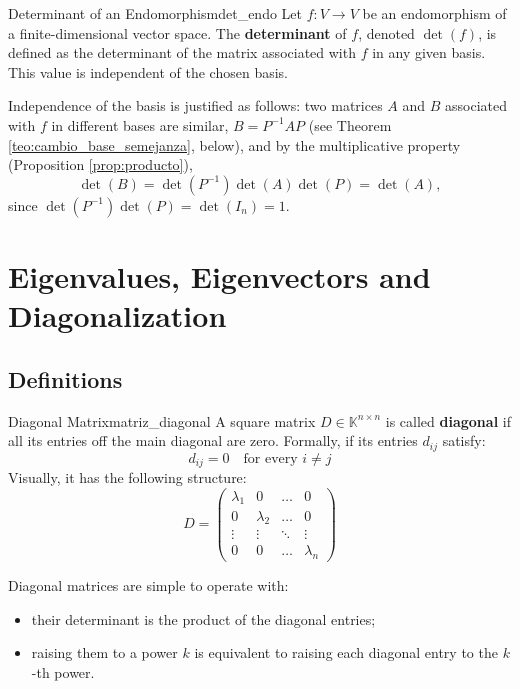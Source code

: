 \documentclass[11pt, a4paper]{article}
\begin{document}
\begin{definicion}{Determinant of an Endomorphism}{det_endo}
Let $f: V \to V$ be an endomorphism of a finite-dimensional vector space. The \textbf{determinant} of $f$, denoted $\det(f)$, is defined as the determinant of the matrix associated with $f$ in any given basis. This value is independent of the chosen basis.
\end{definicion}

\obs Independence of the basis is justified as follows: two matrices $A$ and $B$ associated with $f$ in different bases are similar, $B = P^{-1} A P$ (see Theorem \ref{teo:cambio_base_semejanza}, below), and by the multiplicative property (Proposition \ref{prop:producto}),
\[
\det(B) = \det(P^{-1}) \det(A) \det(P) = \det(A),
\]
since $\det(P^{-1}) \det(P) = \det(I_n) = 1$.

\newpage

\section{Eigenvalues, Eigenvectors and Diagonalization}

\subsection{Definitions}

\begin{definicion}{Diagonal Matrix}{matriz_diagonal}
A square matrix $D \in \mathbb{K}^{n \times n}$ is called \textbf{diagonal} if all its entries off the main diagonal are zero.
Formally, if its entries $d_{ij}$ satisfy:
\[ d_{ij} = 0 \quad \text{for every } i \neq j \]
Visually, it has the following structure:
\[ D = \begin{pmatrix}
\lambda_1 & 0 & \dots & 0 \\
0 & \lambda_2 & \dots & 0 \\
\vdots & \vdots & \ddots & \vdots \\
0 & 0 & \dots & \lambda_n
\end{pmatrix} \]
\end{definicion}

\obs Diagonal matrices are simple to operate with:
\begin{itemize}
    \item their determinant is the product of the diagonal entries;
    \item raising them to a power $k$ is equivalent to raising each diagonal entry to the $k$-th power.
\end{itemize}
\end{document}
